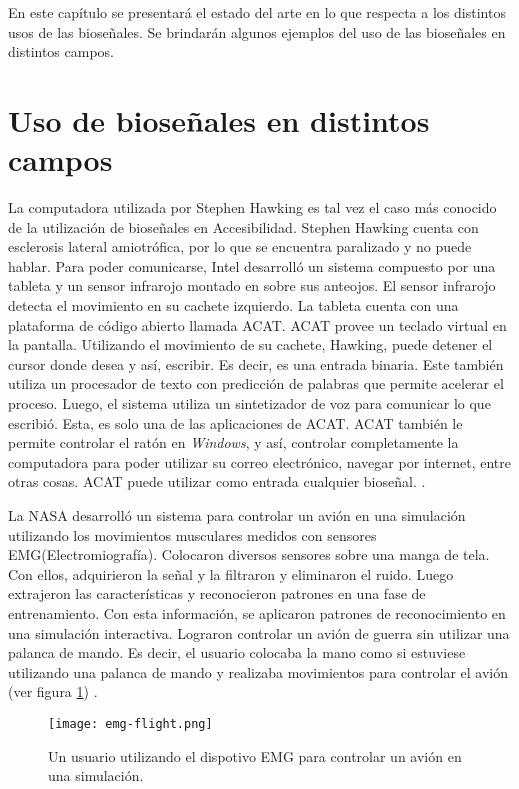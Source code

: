En este capítulo se presentará el estado del arte en lo que respecta a los distintos usos de las bioseñales. Se brindarán algunos ejemplos del uso de las bioseñales en distintos campos.

\section{Uso de bioseñales en distintos campos}

La computadora utilizada por Stephen Hawking es tal vez el caso más conocido de la utilización de bioseñales en Accesibilidad. Stephen Hawking cuenta con esclerosis lateral amiotrófica, por lo que se encuentra paralizado y no puede hablar. Para poder comunicarse, Intel desarrolló un sistema compuesto por una tableta y un sensor infrarojo montado en sobre sus anteojos. El sensor infrarojo detecta el movimiento en su cachete izquierdo. La tableta cuenta con una plataforma de código abierto llamada ACAT. ACAT provee un teclado virtual en la pantalla. Utilizando el movimiento de su cachete, Hawking, puede detener el cursor donde desea y así, escribir. Es decir, es una entrada binaria. Este también utiliza un procesador de texto con predicción de palabras que permite acelerar el proceso.  Luego, el sistema utiliza un sintetizador de voz para comunicar lo que escribió. Esta, es solo una de las aplicaciones de ACAT. ACAT también le permite controlar el ratón en \emph{Windows}, y así, controlar completamente la computadora para poder utilizar su correo electrónico, navegar por internet, entre otras cosas. ACAT puede utilizar como entrada cualquier bioseñal. \cite{hawking}.

La NASA desarrolló un sistema para controlar un avión en una simulación utilizando los movimientos musculares medidos con sensores EMG(Electromiografía). Colocaron diversos sensores sobre una manga de tela. Con ellos, adquirieron la señal y la filtraron y eliminaron el ruido. Luego extrajeron las características y reconocieron patrones en una fase de entrenamiento. Con esta información, se aplicaron patrones de reconocimiento en una simulación interactiva. Lograron controlar un avión de guerra sin utilizar una palanca de mando. Es decir, el usuario colocaba la mano como si estuviese utilizando una palanca de mando y realizaba movimientos para controlar el avión (ver figura \ref{fig:emg-flight}) \cite{emg-flight}.

\begin{figure}[H]
	\centering
    \texttt{[image: emg-flight.png]}
    \caption{Un usuario utilizando el dispotivo EMG para controlar un avión en una simulación.}
	\label{fig:emg-flight}
\end{figure}

